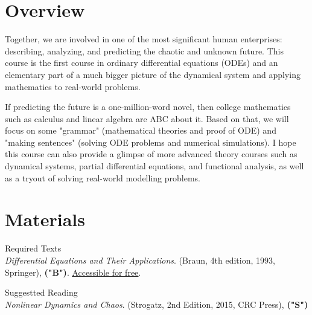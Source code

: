 \documentclass[letterpaper]{inzane_syllabus} %
\begin{document}

\makeprofile %

\section{Overview}
Together, we are involved in one of the most significant human enterprises: describing, analyzing, and predicting the chaotic and unknown future. This course is the first course in ordinary differential equations (ODEs) and an elementary part of a much bigger picture of the dynamical system and applying mathematics to real-world problems.

If predicting the future is a one-million-word novel, then college mathematics such as calculus and linear algebra are ABC about it. Based on that, we will focus on some "grammar" (mathematical theories and proof of ODE) and "making sentences" (solving ODE problems and numerical simulations). I hope this course can also provide a glimpse of more advanced theory courses such as dynamical systems, partial differential equations, and functional analysis, as well as a tryout of solving real-world modelling problems.

\vspace{0.5cm} %
\section{Materials}

{\color{myCOLOR} Required Texts}\\
\textit{Differential Equations and Their Applications}. (Braun, 4th edition, 1993, Springer), \textbf{("B")}. \href{https://link.springer.com/book/10.1007/978-1-4612-4360-1#toc}{\underline{Accessible for free}}.  

{\color{myCOLOR} Suggestted Reading}\\
\textit{Nonlinear Dynamics and Chaos}. (Strogatz, 2nd Edition, 2015, CRC Press), \textbf{("S")} 
\end{document}
